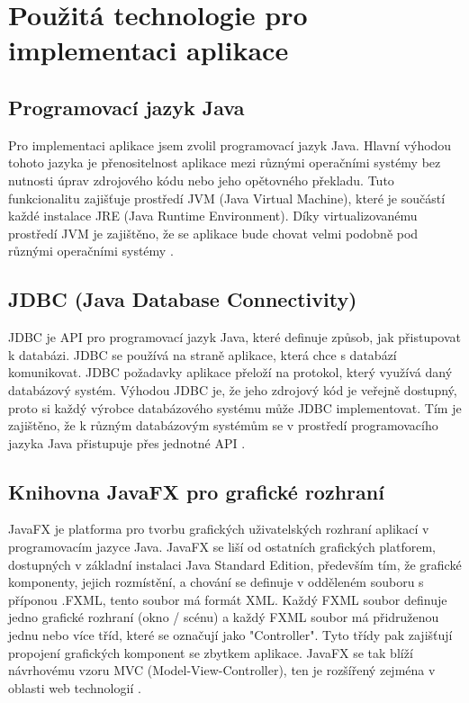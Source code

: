 \documentclass[czech,bachelor,public,dept460,male,cpdeclaration,twoside]{diploma}
\begin{document}
\section{Použitá technologie pro implementaci aplikace} \label{tech}

\subsection{Programovací jazyk Java}
Pro implementaci aplikace jsem zvolil programovací jazyk Java. Hlavní výhodou tohoto jazyka je přenositelnost aplikace mezi různými operačními systémy bez nutnosti úprav zdrojového kódu nebo jeho opětovného překladu. Tuto funkcionalitu zajišťuje prostředí JVM (Java Virtual Machine), které je součástí každé instalace JRE (Java Runtime Environment). Díky virtualizovanému prostředí JVM je zajištěno, že se aplikace bude chovat velmi podobně pod různými operačními systémy \cite{java}.

\subsection{JDBC (Java Database Connectivity)} \label{jdbc}
JDBC je API pro programovací jazyk Java, které definuje způsob, jak přistupovat k databázi. JDBC se používá na straně aplikace, která chce s databází komunikovat. JDBC požadavky aplikace přeloží na protokol, který využívá daný databázový systém. Výhodou JDBC je, že jeho zdrojový kód je veřejně dostupný, proto si každý výrobce databázového systému může JDBC implementovat. Tím je zajištěno, že k různým databázovým systémům se v prostředí programovacího jazyka Java přistupuje přes jednotné API \cite{jdbc}.


\subsection{Knihovna JavaFX pro grafické rozhraní}
JavaFX je platforma pro tvorbu grafických uživatelských rozhraní aplikací v programovacím jazyce Java. JavaFX se liší od ostatních grafických platforem, dostupných v základní instalaci Java Standard Edition, především tím, že grafické komponenty, jejich rozmístění, a chování se definuje v odděleném souboru s příponou .FXML, tento soubor má formát XML. Každý FXML soubor definuje jedno grafické rozhraní (okno / scénu) a každý FXML soubor má přidruženou jednu nebo více tříd, které se označují jako "Controller". Tyto třídy pak zajišťují propojení grafických komponent se zbytkem aplikace. JavaFX se tak blíží návrhovému vzoru MVC (Model-View-Controller), ten je rozšířený zejména v oblasti web technologií \cite{javafx}.
\end{document}
